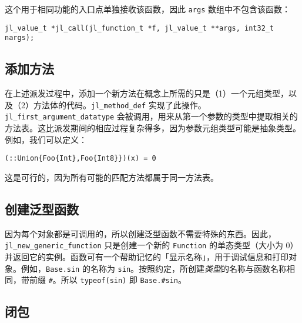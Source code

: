 这个用于相同功能的入口点单独接收该函数，因此 \texttt{args} 数组中不包含该函数：




\begin{lstlisting}
jl_value_t *jl_call(jl_function_t *f, jl_value_t **args, int32_t nargs);
\end{lstlisting}



\hypertarget{12335264465348807608}{}


\subsection{添加方法}



在上述派发过程中，添加一个新方法在概念上所需的只是（1）一个元组类型，以及（2）方法体的代码。\texttt{jl\_method\_def} 实现了此操作。\texttt{jl\_first\_argument\_datatype} 会被调用，用来从第一个参数的类型中提取相关的方法表。这比派发期间的相应过程复杂得多，因为参数元组类型可能是抽象类型。例如，我们可以定义：




\begin{verbatim}
(::Union{Foo{Int},Foo{Int8}})(x) = 0
\end{verbatim}



这是可行的，因为所有可能的匹配方法都属于同一方法表。



\hypertarget{4974882052749632871}{}


\subsection{创建泛型函数}



因为每个对象都是可调用的，所以创建泛型函数不需要特殊的东西。因此，\texttt{jl\_new\_generic\_function} 只是创建一个新的 \texttt{Function} 的单态类型（大小为 0）并返回它的实例。函数可有一个帮助记忆的「显示名称」，用于调试信息和打印对象。例如，\texttt{Base.sin} 的名称为 \texttt{sin}。按照约定，所创建\emph{类型}的名称与函数名称相同，带前缀 \texttt{\#}。所以 \texttt{typeof(sin)} 即 \texttt{Base.\#sin}。



\hypertarget{2172965036514898807}{}


\subsection{闭包}



